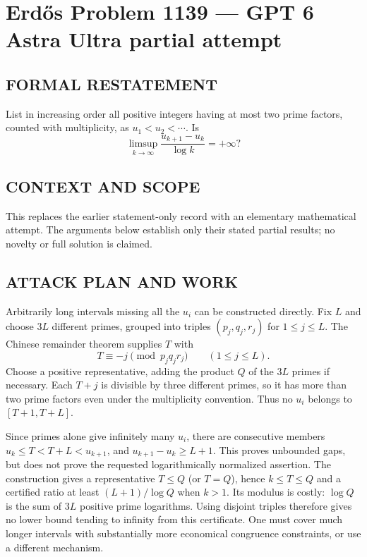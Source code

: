 \section*{Erd\H{o}s Problem 1139 --- GPT 6 Astra Ultra partial attempt}


\subsection*{FORMAL RESTATEMENT}
List in increasing order all positive integers having at most two prime factors, counted with multiplicity, as $u_1<u_2<\cdots$. Is
\[
\limsup_{k\to\infty}\frac{u_{k+1}-u_k}{\log k}=+\infty?
\]

\subsection*{CONTEXT AND SCOPE}
This replaces the earlier statement-only record with an elementary mathematical attempt. The arguments below establish only their stated partial results; no novelty or full solution is claimed.

\subsection*{ATTACK PLAN AND WORK}
Arbitrarily long intervals missing all the $u_i$ can be constructed directly.
Fix $L$ and choose $3L$ different primes, grouped into triples
$(p_j,q_j,r_j)$ for $1\le j\le L$. The Chinese remainder theorem supplies $T$ with
\[T\equiv-j\pmod{p_jq_jr_j}\qquad(1\le j\le L).\]
Choose a positive representative, adding the product $Q$ of the $3L$ primes
if necessary. Each $T+j$ is divisible by three different primes, so it has more
than two prime factors even under the multiplicity convention. Thus no $u_i$
belongs to $[T+1,T+L]$.

Since primes alone give infinitely many $u_i$, there are consecutive members
$u_k\le T<T+L<u_{k+1}$, and $u_{k+1}-u_k\ge L+1$. This proves unbounded gaps,
but does not prove the requested logarithmically normalized assertion.
The construction gives a representative $T\le Q$ (or $T=Q$), hence
$k\le T\le Q$ and a certified ratio at least $(L+1)/\log Q$ when $k>1$.
Its modulus is costly: $\log Q$ is the sum of $3L$ positive prime logarithms.
Using disjoint triples therefore gives no lower bound tending to infinity
from this certificate. One must cover much longer intervals with substantially
more economical congruence constraints, or use a different mechanism.

